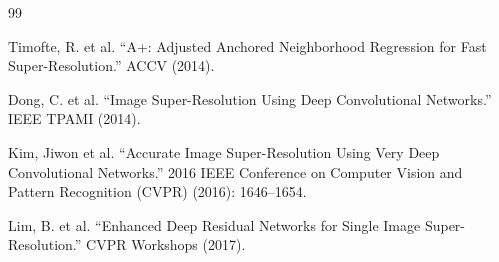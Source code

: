 \documentclass[a4paper,11pt]{article}
\begin{document}
\begin{thebibliography}{99}

Timofte, R. et al. “A+: Adjusted Anchored Neighborhood Regression for Fast Super-Resolution.” ACCV (2014).

Dong, C. et al. “Image Super-Resolution Using Deep Convolutional Networks.” IEEE TPAMI (2014).

Kim, Jiwon et al. ``Accurate Image Super-Resolution Using Very Deep Convolutional Networks.'' 2016 IEEE Conference on Computer Vision and Pattern Recognition (CVPR) (2016): 1646--1654.

Lim, B. et al. “Enhanced Deep Residual Networks for Single Image Super-Resolution.” CVPR Workshops (2017).

\end{thebibliography}
\end{document}
